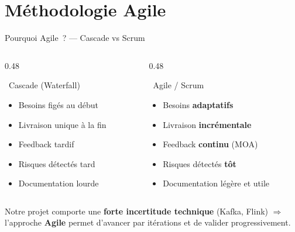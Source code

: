 \documentclass[aspectratio=169, 12pt]{beamer}
\begin{document}
\section{Méthodologie Agile}

\begin{frame}{Pourquoi Agile~? --- Cascade vs Scrum}
  \begin{columns}[T]
    \begin{column}{0.48\textwidth}
      \begin{alertblock}{\faTimesCircle\ Cascade (Waterfall)}
        \begin{itemize}
          \item Besoins figés au début
          \item Livraison unique à la fin
          \item Feedback tardif
          \item Risques détectés tard
          \item Documentation lourde
        \end{itemize}
      \end{alertblock}
    \end{column}
    \begin{column}{0.48\textwidth}
      \begin{exampleblock}{\faCheckCircle\ Agile / Scrum}
        \begin{itemize}
          \item Besoins \textbf{adaptatifs}
          \item Livraison \textbf{incrémentale}
          \item Feedback \textbf{continu} (MOA)
          \item Risques détectés \textbf{tôt}
          \item Documentation légère et utile
        \end{itemize}
      \end{exampleblock}
    \end{column}
  \end{columns}

  \vspace{0.5cm}
  \begin{block}{}
    \centering\small
    Notre projet comporte une \textbf{forte incertitude technique} (Kafka, Flink) $\Rightarrow$ l'approche \textbf{Agile} permet d'avancer par itérations et de valider progressivement.
  \end{block}
\end{frame}
\end{document}
